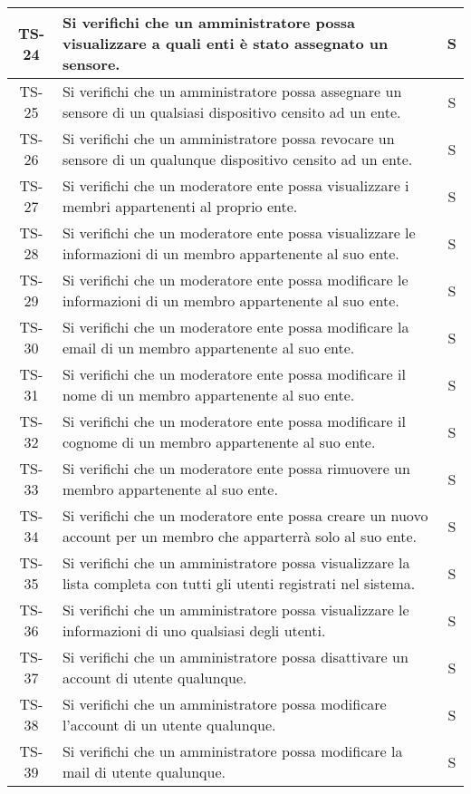 \begin{center}
\begin{longtable}{|c|p{10cm}|c|}
			 \hline
			 TS-24 & Si verifichi che un amministratore possa visualizzare a quali enti è stato assegnato un sensore. & S \\
			 \hline
			 TS-25 & Si verifichi che un amministratore possa assegnare un sensore di un qualsiasi dispositivo censito ad un ente. & S \\
			 \hline
			 TS-26 & Si verifichi che un amministratore possa revocare un sensore di un qualunque dispositivo censito ad un ente. & S \\
			 \hline
			 TS-27 &  Si verifichi che un moderatore ente possa visualizzare i membri appartenenti al proprio ente. & S \\
			 \hline
			 TS-28 & Si verifichi che un moderatore ente possa visualizzare le informazioni di un membro appartenente al suo ente. & S \\
			 \hline
			 TS-29 & Si verifichi che un moderatore ente possa modificare le informazioni di un membro appartenente al suo ente. & S \\
			 \hline
			 TS-30 & Si verifichi che un moderatore ente possa modificare la email di un membro appartenente al suo ente. & S \\
			 \hline
			 TS-31 & Si verifichi che un moderatore ente possa modificare il nome di un membro appartenente al suo ente. & S \\
			 \hline
			 TS-32 & Si verifichi che un moderatore ente possa modificare il cognome di un membro appartenente al suo ente. & S \\
			 \hline
			 TS-33 & Si verifichi che un moderatore ente possa rimuovere un membro appartenente al suo ente. & S \\
			 \hline
			 TS-34 & Si verifichi che un moderatore ente possa creare un nuovo account per un membro che apparterrà solo al suo ente. & S \\
			 \hline
			 TS-35 & Si verifichi che un amministratore possa visualizzare la lista completa con tutti gli utenti registrati nel sistema. & S \\
			 \hline
			 TS-36 & Si verifichi che un amministratore possa visualizzare le informazioni di uno qualsiasi degli utenti. & S \\
			 \hline
			 TS-37 & Si verifichi che un amministratore possa disattivare un account di utente qualunque. & S \\
			 \hline
			 TS-38 & Si verifichi che un amministratore possa modificare l'account di un utente qualunque. & S \\
			 \hline
			 TS-39 & Si verifichi che un amministratore possa modificare la mail di utente qualunque. & S \\

\end{longtable}
\end{center}
